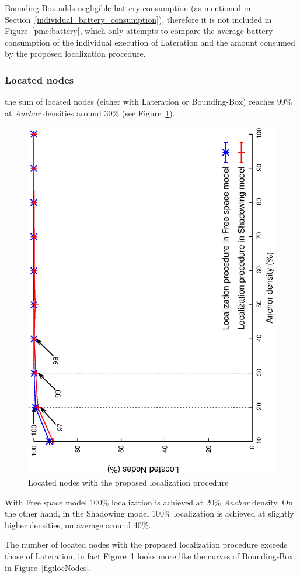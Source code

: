 Bounding-Box adds negligible battery consumption (as mentioned in Section~\ref{individual_battery_consumption}), therefore it is not included in Figure~\ref{pme:battery}, which only attempts to compare the average battery consumption of the individual execution of Lateration and the amount consumed by the proposed localization procedure.

\subsubsection{Located nodes}\label{locProc_locatedNodes}
the sum of located nodes (either with Lateration or Bounding-Box) reaches 99\% at \emph{Anchor} densities around 30\% (see Figure~\ref{pme:locNodes}).

\begin{figure}[htbp]
  \centering
  \includegraphics[width=0.7\linewidth, angle = -90]{section4/figures/pmeLocNodes.eps}
  \caption{Located nodes with the proposed localization procedure
  \label{pme:locNodes}}
\end{figure}

With Free space model 100\% localization is achieved at 20\% \emph{Anchor} density. On the other hand, in the Shadowing model 100\% localization is achieved at slightly higher densities, on average around 40\%.

The number of located nodes with the proposed localization procedure exceeds those of Lateration, in fact Figure~\ref{pme:locNodes} looks more like the curves of Bounding-Box in Figure~\ref{fig:locNodes}.

